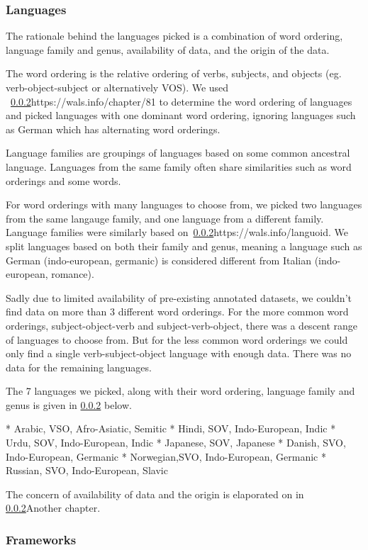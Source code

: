\subsubsection{Languages}

The rationale behind the languages picked is a combination of word ordering,
language family and genus, availability of data, and the origin of the data.

The word ordering is the relative ordering of verbs, subjects, and objects (eg.
verb-object-subject or alternatively VOS). We used
~\ref{}{https://wals.info/chapter/81} to determine the word ordering of
languages and picked languages with one dominant word ordering, ignoring
languages such as German which has alternating word orderings. 

Language families are groupings of languages based on some common ancestral
language. Languages from the same family often share similarities such as word
orderings and some words. 

For word orderings with many languages to choose from, we picked two languages
from the same langauge family, and one language from a different family.
Language families were similarly based on~\ref{}{https://wals.info/languoid}. We
split languages based on both their family and genus, meaning a language such as
German (indo-european, germanic) is considered different from Italian
(indo-european, romance).

Sadly due to limited availability of pre-existing annotated datasets, we
couldn't find data on more than 3 different word orderings. For the more common
word orderings, subject-object-verb and subject-verb-object, there was a descent
range of languages to choose from. But for the less common word orderings we
could only find a single verb-subject-object language with enough data. There
was no data for the remaining languages. 

The 7 languages we picked, along with their word ordering, language family and
genus is given in \ref{} below.

* Arabic,   VSO, Afro-Asiatic, Semitic 
* Hindi,    SOV, Indo-European, Indic
* Urdu,     SOV, Indo-European, Indic
* Japanese, SOV, Japanese
* Danish,   SVO, Indo-European, Germanic
* Norwegian,SVO, Indo-European, Germanic
* Russian,  SVO, Indo-European, Slavic

The concern of availability of data and the origin is elaporated on in
\ref{}{Another chapter}.


\subsubsection{Frameworks}

